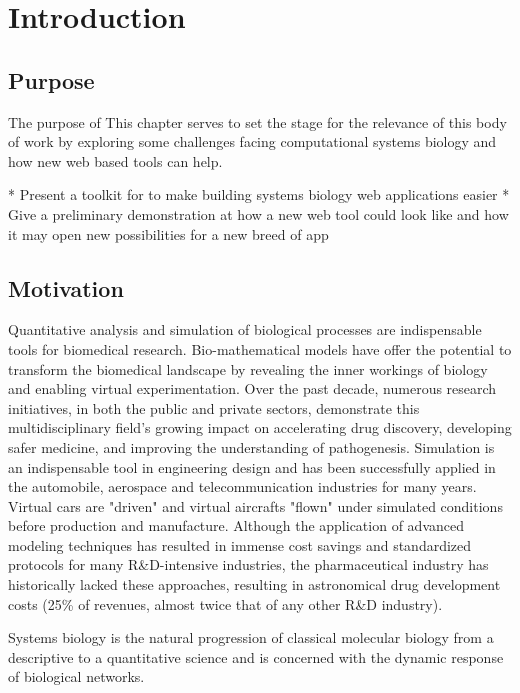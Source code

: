 \chapter{Introduction}

\section{Purpose}
The purpose of 
This chapter serves to set the stage for the relevance of this body of work by exploring some challenges facing computational systems biology and how new web based tools can help.

* Present a toolkit for to make building systems biology web applications easier
* Give a preliminary demonstration at how a new web tool could look like and how it may open new possibilities for a new breed of app

\section{Motivation}

Quantitative analysis and simulation of biological processes are indispensable tools for biomedical research.
Bio-mathematical models have offer the potential to transform the biomedical landscape by revealing the inner workings of biology and enabling virtual experimentation.
Over the past decade, numerous research initiatives, in both the public and private sectors, demonstrate this multidisciplinary field’s growing impact on accelerating drug discovery, developing safer medicine, and improving the understanding of pathogenesis. \autocite{kitano2002computational, kitano2010grand, mack2004can}
Simulation is an indispensable tool in engineering design and has been successfully applied in the automobile, aerospace and telecommunication industries for many years.
Virtual cars are "driven" and virtual aircrafts "flown" under simulated conditions before production and manufacture. \autocite{ghosh2010connecting}
Although the application of advanced modeling techniques has resulted in immense cost savings and standardized protocols for many R\&D-intensive industries, the pharmaceutical industry has historically lacked these approaches, resulting in astronomical drug development costs (25\% of revenues, almost twice that of any other R\&D industry). \autocite{economist2005models}

Systems biology is the natural progression of classical molecular
biology from a descriptive to a quantitative science and is concerned
with the dynamic response of biological networks.

